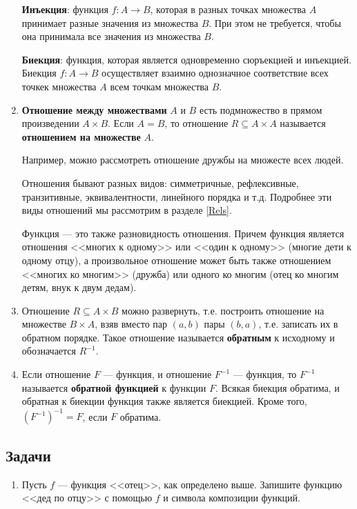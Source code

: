 \begin{enumerate}
\textbf{Инъекция}: функция $f:A\to B$, которая в разных точках множества $A$ принимает разные значения из множества $B$. При этом не требуется, чтобы она принимала все значения из множества $B$.

\textbf{Биекция}: функция, которая является одновременно сюръекцией и инъекцией. Биекция $f:A\to B$ осуществляет взаимно однозначное соответствие всех точкек множества $A$ всем точкам множества $B$.

\item \textbf{Отношение между множествами} $A$ и $B$ есть подмножество в прямом произведении $A\times B$. Если $A=B$, то отношение $R\subseteq A\times A$ называется \textbf{отношением на множестве} $A$.

Например, можно рассмотреть отношение дружбы на множесте всех людей.

Отношения бывают разных видов: симметричные, рефлексивные, транзитивные, эквивалентности, линейного порядка и т.д. Подробнее эти виды отношений мы рассмотрим в разделе \ref{Rels}.

Функция --- это также разновидность отношения. Причем функция является отношения <<многих к одному>> или <<один к одному>> (многие дети к одному отцу), а произвольное отношение может быть также отношением <<многих ко многим>> (дружба) или одного ко многим (отец ко многим детям, внук к двум дедам).

\item Отношение $R\subseteq A\times B$ можно развернуть, т.е. построить отношение на множестве $B\times A$, взяв вместо пар $(a,b)$ пары $(b,a)$, т.е. записать их в обратном порядке. Такое отношение называется \textbf{обратным} к исходному и обозначается $R^{-1}$.

\item Если отношение $F$ --- функция, и отношение $F^{-1}$ --- функция, то $F^{-1}$ называется \textbf{обратной функцией} к функции $F$. Всякая биекция обратима, и обратная к биекции функция также является биекцией. Кроме того, $(F^{-1})^{-1}=F$, если $F$ обратима.

\end{enumerate}


\subsection*{Задачи}

\begin{enumerate}
\item Пусть $f$ --- функция <<отец>>, как определено выше. Запишите функцию <<дед по отцу>> с помощью $f$ и символа композиции функций.
\end{enumerate}



